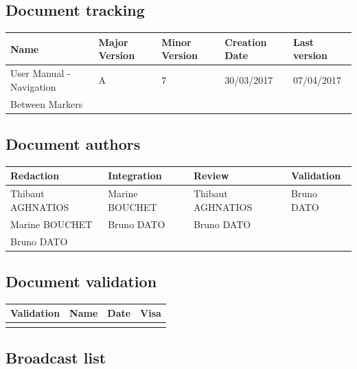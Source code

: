 \documentclass[10pt,a4paper]{article}
\begin{document}
\newpage


\subsection*{Document tracking}

\begin{center}
    \begin{tabular}{| l | l | l | l | l |}
    \hline
     \rowcolor{gray} Name & Major Version & Minor Version & Creation Date & Last version \\ \hline
    User Manual - Navigation & A & 7 & 30/03/2017 & 07/04/2017 \\ 
    Between Markers &  &  &  &  \\ \hline
    \end{tabular}
\end{center}


\subsection*{Document authors}

\begin{center}
    \begin{tabular}{| l | l | l | l |}
    \hline
    \rowcolor{gray} Redaction & Integration & Review & Validation \\ \hline
    Thibaut AGHNATIOS & Marine BOUCHET & Thibaut AGHNATIOS & Bruno DATO \\  
    Marine BOUCHET & Bruno DATO & Bruno DATO  &  \\  
    Bruno DATO &  & &  \\  \hline
    \end{tabular}
\end{center}

\subsection*{Document validation}

\begin{center}
    \begin{tabular}{| l | l | l | l |}
    \hline
     \rowcolor{gray} Validation & Name & Date & Visa \\ \hline
    & & & \\
     \hline
    \end{tabular}
\end{center}

\subsection*{Broadcast list}
\end{document}
